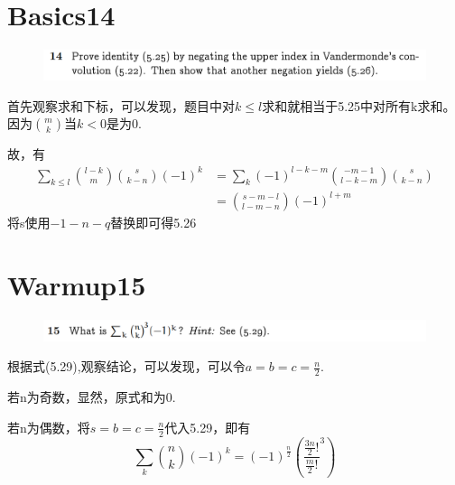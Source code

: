 \documentclass[]{article}
\begin{document}
\section*{Basics14}
\begin{figure}[H]
    \includegraphics[scale = 0.6]{2023-04-03-17-17-40.png}
\end{figure}
首先观察求和下标，可以发现，题目中对$k \le l$求和就相当于5.25中对所有k求和。因为$\binom{m}{k}$当$k <0$是为0.\par 
故，有
\begin{align}
    \sum_{k \le l} \binom{l-k}{m}\binom{s}{k-n}(-1)^{k} &= \sum_{k}(-1)^{l-k-m}\binom{-m-1}{l-k-m}\binom{s}{k-n}\\
    &=\binom{s-m-l}{l-m-n}(-1)^{l+m}
\end{align}
将s使用$-1-n-q$替换即可得5.26\par 

\section*{Warmup15}
\begin{figure}[H]
    \includegraphics[scale = 0.6]{2023-04-03-17-17-56.png}
\end{figure}
根据式(5.29),观察结论，可以发现，可以令$a=b=c=\frac{n}{2}$.
\par 
若n为奇数，显然，原式和为0.\par 
若n为偶数，将$s=b=c=\frac{n}{2}$代入5.29，即有
\begin{equation}
    \sum_{k}\binom{n}{k}(-1)^k = (-1)^{\frac{n}{2}}(\frac{\frac{3n}{2} !}{\frac{m}{2} !}^{3})
\end{equation}
\end{document}
